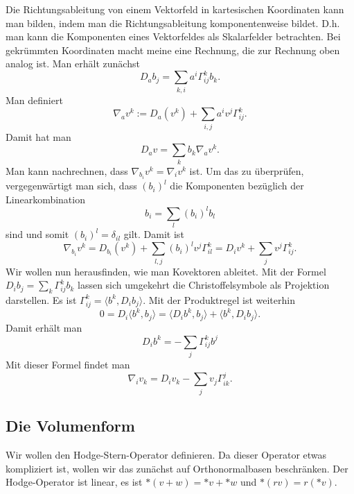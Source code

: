 \documentclass[a4paper,10pt,fleqn,twocolumn,twoside]{article}
\begin{document}
Die Richtungsableitung von einem Vektorfeld in kartesischen
Koordinaten kann man bilden, indem man die Richtungsableitung
komponentenweise bildet. D.h. man kann die Komponenten eines
Vektorfeldes als Skalarfelder betrachten. Bei gekrümmten Koordinaten
macht meine eine Rechnung, die zur Rechnung oben analog ist.
Man erhält zunächst
\begin{equation}
D_a b_j = \sum_{k,i}a^i \Gamma_{ij}^k b_k.
\end{equation}
Man definiert
\begin{equation}
\nabla_a v^k := D_a(v^k) + \sum_{i,j}a^i v^j \Gamma_{ij}^k.
\end{equation}
Damit hat man
\begin{equation}
D_a v = \sum_k b_k \nabla_a v^k.
\end{equation}
Man kann nachrechnen, dass $\nabla_{b_i}v^k=\nabla_i v^k$ ist.
Um das zu überprüfen, vergegenwärtigt man sich, dass $(b_i)^l$
die Komponenten bezüglich der Linearkombination 
\begin{equation}
b_i = \sum_{l} (b_i)^l b_l
\end{equation}
sind und somit $(b_i)^l=\delta_{il}$ gilt. Damit ist
\begin{equation}
\nabla_{b_i} v^k = D_{b_i}(v^k)
+ \sum_{l,j}(b_i)^l v^j \Gamma_{il}^k
= D_i v^k + \sum_{j} v^j\Gamma_{ij}^k.
\end{equation}
Wir wollen nun herausfinden, wie man Kovektoren ableitet.
Mit der Formel $D_ib_j=\sum_k\Gamma_{ij}^k b_k$ lassen sich
umgekehrt die Christoffelsymbole als Projektion darstellen. Es ist
$\Gamma_{ij}^k = \langle b^k,D_ib_j\rangle.$
Mit der Produktregel ist weiterhin
\begin{equation}
0=D_i\langle b^k,b_j\rangle
= \langle D_ib^k,b_j\rangle + \langle b^k,D_ib_j\rangle.
\end{equation}
Damit erhält man
\begin{equation}
D_ib^k = -\sum_{j}\Gamma_{ij}^kb^j
\end{equation}
Mit dieser Formel findet man
\begin{equation}
\nabla_i v_k = D_iv_k-\sum_{j}v_j\Gamma_{ik}^j.
\end{equation}

\subsection{Die Volumenform}

Wir wollen den Hodge-Stern-Operator definieren. Da dieser Operator
etwas kompliziert ist, wollen wir das zunächst auf Orthonormalbasen
beschränken. Der Hodge-Operator ist linear, es ist
$*(v+w) = *v+*w$ und $*(rv)=r(*v)$.
\end{document}
